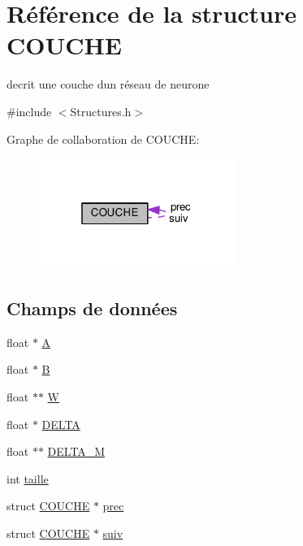 \hypertarget{structCOUCHE}{}\section{Référence de la structure C\+O\+U\+C\+HE}
\label{structCOUCHE}


decrit une couche d\textquotesingle{}un réseau de neurone  




{\ttfamily \#include $<$Structures.\+h$>$}



Graphe de collaboration de C\+O\+U\+C\+HE\+:\nopagebreak
\begin{figure}[H]
\begin{center}
\leavevmode
\includegraphics[width=181pt]{structCOUCHE__coll__graph}
\end{center}
\end{figure}
\subsection*{Champs de données}
\begin{DoxyCompactItemize}
\item 
float $\ast$ \hyperlink{structCOUCHE_a2218fee1751e9b8b7355ebe577938f8a}{A}
\item 
float $\ast$ \hyperlink{structCOUCHE_ae39541beb5026e0dc23b79066d841d8a}{B}
\item 
float $\ast$$\ast$ \hyperlink{structCOUCHE_a73df475e85bcea1ab23f681777d2ca2b}{W}
\item 
float $\ast$ \hyperlink{structCOUCHE_a091237265ad9fafe21bad7b8a9cb41e1}{D\+E\+L\+TA}
\item 
float $\ast$$\ast$ \hyperlink{structCOUCHE_ac28815a9c587cba7def4901a7bcfd244}{D\+E\+L\+T\+A\+\_\+M}
\item 
int \hyperlink{structCOUCHE_af841b5acbf63ea3b57522ce796497719}{taille}
\item 
struct \hyperlink{structCOUCHE}{C\+O\+U\+C\+HE} $\ast$ \hyperlink{structCOUCHE_ada93a5c424f0cc1b52d549866ffcd6f9}{prec}
\item 
struct \hyperlink{structCOUCHE}{C\+O\+U\+C\+HE} $\ast$ \hyperlink{structCOUCHE_a17139b5e6dd8e69f1704d902742085cc}{suiv}
\end{DoxyCompactItemize}


